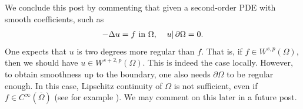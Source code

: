 \documentclass[
    a4paper,
    DIV=14,
    abstract=true,
    numbers=noenddot
]{scrartcl}
\begin{document}







We conclude this post by commenting that given a second-order PDE with smooth coefficients, such as
\begin{align*}
    - \Delta u =f \text{ in } \Omega , \quad \left.u\right|{\partial \Omega }= 0.
\end{align*}
One expects that $u$ is two degrees more regular than $f$. That is, if $f \in W^{s,p}(\Omega )$, then we should have $u \in W^{s+2,p}(\Omega )$. This is indeed the case locally. However, to obtain smoothness up to the boundary, one also needs $\partial \Omega $  to be regular enough. In this case, Lipschitz continuity of $\Omega $ is not sufficient, even if $f \in C^\infty(\overline{\Omega } )$ (see for example \cite{savare1998regularity}). We may comment on this later in a future post.








\end{document}

